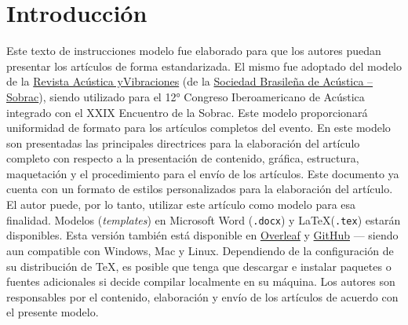 \documentclass[12pt, a4paper, twoside, twocolumn]{article}
\begin{document}
 \setcounter{page}{1} 
\clearpage %

\section{Introducción}
Este texto de instrucciones modelo fue elaborado para que los autores puedan presentar los artículos de forma estandarizada. El mismo fue adoptado del modelo de la \href{https://revista.acustica.org.br/acustica/user/setLocale/es_ES?source=%2Facustica%2Findex}{Revista Acústica y\linebreak Vibraciones} (de la \href{https://revista.acustica.org.br/}{Sociedad Brasileña de Acústica -- Sobrac}), siendo utilizado para el 12° Congreso Iberoamericano de Acústica integrado con el XXIX Encuentro de la Sobrac.
%
Este modelo proporcionará uniformidad de formato para los artículos completos del evento.
En este modelo son presentadas las principales directrices para la elaboración del artículo completo con respecto a la presentación de contenido, gráfica, estructura, maquetación y el procedimiento para el envío de los artículos.
Este documento ya cuenta con un formato de estilos personalizados para la elaboración del artículo. El autor puede, por lo tanto, utilizar este artículo como modelo para esa finalidad. Modelos (\textit{templates}) en Microsoft Word (\texttt{.docx}) y \LaTeX\xspace (\texttt{.tex}) estarán disponibles. Esta versión también está disponible en \href{https://www.overleaf.com/read/rnfjxkknksnd}{Overleaf} y \href{https://github.com/willdfonseca/fia2020}{GitHub} --- siendo aun compatible con Windows, Mac y Linux.
Dependiendo de la configuración de su distribución de TeX, es posible que tenga que descargar e instalar paquetes o fuentes adicionales si decide compilar localmente en su máquina.
Los autores son responsables por el contenido, elaboración y envío de los artículos de acuerdo con el presente modelo.

\end{document}
